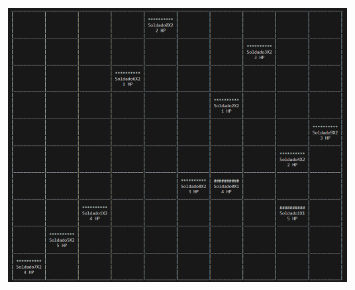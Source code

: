 \documentclass{article}
\begin{document}
	\begin{figure}[H]
		\centering
	\includegraphics[width=0.8\textwidth,keepaspectratio]{img/captura1.png}
	\end{figure}
	
\end{document}
